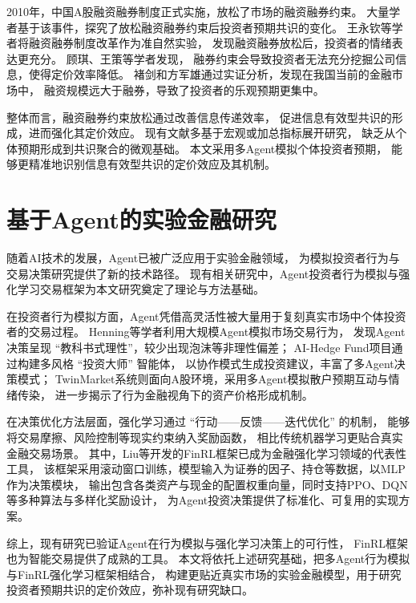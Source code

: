 2010年，中国A股融资融券制度正式实施，放松了市场的融资融券约束。
大量学者基于该事件，探究了放松融资融券约束后投资者预期共识的变化。
王永钦等学者将融资融券制度改革作为准自然实验，
发现融资融券放松后，投资者的情绪表达更充分\cite{王永钦2026杠杆信息与流动性}。
顾琪、王策等学者发现，
融券约束会导致投资者无法充分挖掘公司信息，使得定价效率降低\cite{顾琪2017卖空摩擦与股价同步性}。
褚剑和方军雄通过实证分析，发现在我国当前的金融市场中，
融资规模远大于融券，导致了投资者的乐观预期更集中\cite{褚2019margin}。

整体而言，融资融券约束放松通过改善信息传递效率，
促进信息有效型共识的形成，进而强化其定价效应。
现有文献多基于宏观或加总指标展开研究，
缺乏从个体预期形成到共识聚合的微观基础。
本文采用多Agent模拟个体投资者预期，
能够更精准地识别信息有效型共识的定价效应及其机制。

\section{基于Agent的实验金融研究}  
随着AI技术的发展，Agent已被广泛应用于实验金融领域，
为模拟投资者行为与交易决策研究提供了新的技术路径\cite{ahmed2022artificial}。
现有相关研究中，Agent投资者行为模拟与强化学习交易框架为本文研究奠定了理论与方法基础。

在投资者行为模拟方面，Agent凭借高灵活性被大量用于复刻真实市场中个体投资者的交易过程。
Henning等学者利用大规模Agent模拟市场交易行为，
发现Agent决策呈现 “教科书式理性”，较少出现泡沫等非理性偏差\cite{henning2025llm}；
AI-Hedge Fund项目通过构建多风格 “投资大师” 智能体，
以协作模式生成投资建议，丰富了多Agent决策模式\cite{virattt2025aihedgefund}；
TwinMarket系统则面向A股环境，采用多Agent模拟散户预期互动与情绪传染，
进一步揭示了行为金融视角下的资产价格形成机制\cite{yang2025twinmarket}。

在决策优化方法层面，强化学习通过 “行动——反馈——迭代优化” 的机制，
能够将交易摩擦、风险控制等现实约束纳入奖励函数，
相比传统机器学习更贴合真实金融交易场景\cite{bai2025review}\cite{qureshi2026deep}。
其中，Liu等开发的FinRL框架已成为金融强化学习领域的代表性工具，
该框架采用滚动窗口训练，模型输入为证券的因子、持仓等数据，以MLP作为决策模块，
输出包含各类资产与现金的配置权重向量，同时支持PPO、DQN等多种算法与多样化奖励设计，
为Agent投资决策提供了标准化、可复用的实现方案\cite{liu2021finrl}。

综上，现有研究已验证Agent在行为模拟与强化学习决策上的可行性，
FinRL框架也为智能交易提供了成熟的工具。
本文将依托上述研究基础，把多Agent行为模拟与FinRL强化学习框架相结合，
构建更贴近真实市场的实验金融模型，用于研究投资者预期共识的定价效应，弥补现有研究缺口。






